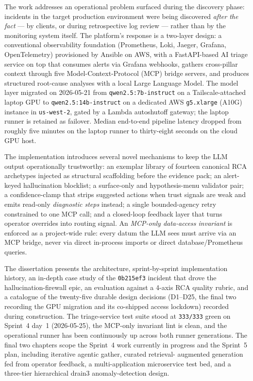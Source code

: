 \documentclass[11pt,a4paper,oneside]{report}
\begin{document}
The work addresses an operational problem surfaced during the discovery
phase: incidents in the target production environment were being
discovered \emph{after the fact} --- by clients, or during retrospective
log review --- rather than by the monitoring system itself.  The
platform's response is a two-layer design: a conventional
observability foundation (Prometheus, Loki, Jaeger, Grafana, OpenTelemetry)
provisioned by Ansible on AWS, with a FastAPI-based AI triage service
on top that consumes alerts via Grafana webhooks, gathers cross-pillar
context through five Model-Context-Protocol (MCP) bridge servers, and
produces structured root-cause analyses with a local Large Language
Model.  The model layer migrated on 2026-05-21 from
\texttt{qwen2.5:7b-instruct} on a Tailscale-attached laptop GPU to
\texttt{qwen2.5:14b-instruct} on a dedicated AWS \texttt{g5.xlarge}
(A10G) instance in \texttt{us-west-2}, gated by a Lambda autoshutoff
gateway; the laptop runner is retained as failover.  Median
end-to-end pipeline latency dropped from roughly five minutes on the
laptop runner to thirty-eight seconds on the cloud GPU host.

The implementation introduces several novel mechanisms to keep the
LLM output operationally trustworthy: an exemplar library of fourteen
canonical RCA archetypes injected as structural scaffolding before
the evidence pack; an alert-keyed hallucination blocklist; a
surface-only and hypothesis-menu validator pair; a confidence-clamp
that strips suggested actions when trust signals are weak and emits
read-only \emph{diagnostic steps} instead; a single bounded-agency
retry constrained to one MCP call; and a closed-loop feedback layer
that turns operator overrides into routing signal.  An
\emph{MCP-only data-access invariant} is enforced as a project-wide
rule: every datum the LLM sees must arrive via an MCP bridge, never
via direct in-process imports or direct database/Prometheus queries.

The dissertation presents the architecture, sprint-by-sprint
implementation history, an in-depth case study of the
\texttt{0b215ef3} incident that drove the hallucination-firewall epic,
an evaluation against a 4-axis RCA quality rubric, and a catalogue of
the twenty-five durable design decisions (D1--D25, the final two
recording the GPU migration and its co-shipped access lockdown)
recorded during construction.  The triage-service test suite stood
at \texttt{333/333} green on Sprint~4 day~1 (2026-05-25), the
MCP-only invariant lint is clean, and the operational runner has
been continuously up across both runner generations.  The final two
chapters scope the Sprint~4 work currently in progress and the
Sprint~5 plan, including iterative agentic gather, curated retrieval-
augmented generation fed from operator feedback, a multi-application
microservice test bed, and a three-tier hierarchical drain3
anomaly-detection design.
\end{document}
